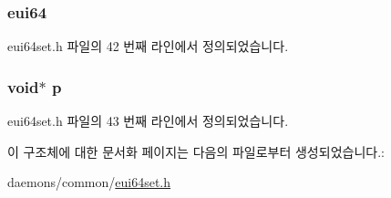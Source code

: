 \subsubsection[{\texorpdfstring{eui64}{eui64}}]{ eui64}\hypertarget{structeui64set__entry_a1fcd42f07fb4db9e8b582c788572ed38}{}\label{structeui64set__entry_a1fcd42f07fb4db9e8b582c788572ed38}


eui64set.\+h 파일의 42 번째 라인에서 정의되었습니다.

\subsubsection[{\texorpdfstring{p}{p}}]{\setlength{\rightskip}{0pt plus 5cm}void$\ast$ p}\hypertarget{structeui64set__entry_a117104b82864d3b23ec174af6d392709}{}\label{structeui64set__entry_a117104b82864d3b23ec174af6d392709}


eui64set.\+h 파일의 43 번째 라인에서 정의되었습니다.



이 구조체에 대한 문서화 페이지는 다음의 파일로부터 생성되었습니다.\+:\begin{DoxyCompactItemize}
\item 
daemons/common/\hyperlink{eui64set_8h}{eui64set.\+h}\end{DoxyCompactItemize}
